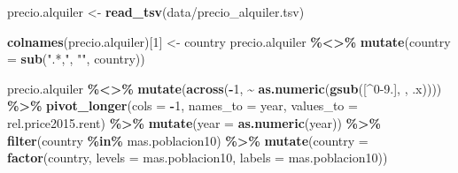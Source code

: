 \documentclass[water,article,submit,pdftex,moreauthors]{Definitions/mdpi}
\newenvironment{Shaded}{\begin{snugshade}}{\end{snugshade}}
\newcommand{\AttributeTok}[1]{\textcolor[rgb]{0.13,0.29,0.53}{#1}}
\newcommand{\DecValTok}[1]{\textcolor[rgb]{0.00,0.00,0.81}{#1}}
\newcommand{\FunctionTok}[1]{\textcolor[rgb]{0.13,0.29,0.53}{\textbf{#1}}}
\newcommand{\NormalTok}[1]{#1}
\newcommand{\OtherTok}[1]{\textcolor[rgb]{0.56,0.35,0.01}{#1}}
\newcommand{\SpecialCharTok}[1]{\textcolor[rgb]{0.81,0.36,0.00}{\textbf{#1}}}
\newcommand{\StringTok}[1]{\textcolor[rgb]{0.31,0.60,0.02}{#1}}
\begin{document}
\begin{Shaded}
\begin{Highlighting}[]
\NormalTok{precio.alquiler }\OtherTok{\textless{}{-}} \FunctionTok{read\_tsv}\NormalTok{(}\StringTok{\textquotesingle{}data/precio\_alquiler.tsv\textquotesingle{}}\NormalTok{)}

\FunctionTok{colnames}\NormalTok{(precio.alquiler)[}\DecValTok{1}\NormalTok{] }\OtherTok{\textless{}{-}} \StringTok{\textquotesingle{}country\textquotesingle{}}
\NormalTok{precio.alquiler }\SpecialCharTok{\%\textless{}\textgreater{}\%} \FunctionTok{mutate}\NormalTok{(}\AttributeTok{country =} \FunctionTok{sub}\NormalTok{(}\StringTok{".*,"}\NormalTok{, }\StringTok{""}\NormalTok{, country))}

\NormalTok{precio.alquiler }\SpecialCharTok{\%\textless{}\textgreater{}\%} \FunctionTok{mutate}\NormalTok{(}\FunctionTok{across}\NormalTok{(}\SpecialCharTok{{-}}\DecValTok{1}\NormalTok{, }\SpecialCharTok{\textasciitilde{}} \FunctionTok{as.numeric}\NormalTok{(}\FunctionTok{gsub}\NormalTok{(}\StringTok{\textquotesingle{}[\^{}0{-}9.]\textquotesingle{}}\NormalTok{, }\StringTok{\textquotesingle{}\textquotesingle{}}\NormalTok{, .x)))) }\SpecialCharTok{\%\textgreater{}\%} \FunctionTok{pivot\_longer}\NormalTok{(}\AttributeTok{cols =} \SpecialCharTok{{-}}\DecValTok{1}\NormalTok{, }\AttributeTok{names\_to =} \StringTok{\textquotesingle{}year\textquotesingle{}}\NormalTok{, }\AttributeTok{values\_to =} \StringTok{\textquotesingle{}rel.price2015.rent\textquotesingle{}}\NormalTok{) }\SpecialCharTok{\%\textgreater{}\%} \FunctionTok{mutate}\NormalTok{(}\AttributeTok{year =} \FunctionTok{as.numeric}\NormalTok{(year)) }\SpecialCharTok{\%\textgreater{}\%} \FunctionTok{filter}\NormalTok{(country }\SpecialCharTok{\%in\%}\NormalTok{ mas.poblacion10) }\SpecialCharTok{\%\textgreater{}\%} \FunctionTok{mutate}\NormalTok{(}\AttributeTok{country =} \FunctionTok{factor}\NormalTok{(country, }\AttributeTok{levels =}\NormalTok{ mas.poblacion10, }\AttributeTok{labels =}\NormalTok{ mas.poblacion10))}
\end{Highlighting}
\end{Shaded}
\end{document}
